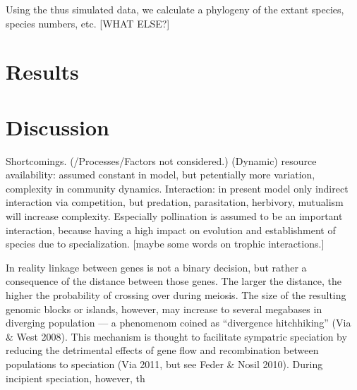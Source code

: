 \documentclass[a4paper]{scrartcl}
\begin{document}
Using the thus simulated data, we calculate a phylogeny of the extant species, species numbers, etc. [WHAT ELSE?]
\section{Results}

\section{Discussion}
Shortcomings. (/Processes/Factors not considered.)
(Dynamic) resource availability: assumed constant in model, but petentially more variation, complexity in community dynamics.
Interaction: in present model only indirect interaction via competition, but predation, parasitation, herbivory, mutualism will increase complexity.
Especially pollination is assumed to be an important interaction, because having a high impact on evolution and establishment of species due to specialization.
[maybe some words on trophic interactions.]

In reality linkage between genes is not a binary decision, but rather a consequence of the distance between those genes.
The larger the distance, the higher the probability of crossing over during meiosis.
The size of the resulting genomic blocks or islands, however, may increase to several megabases in diverging population ---
a phenomenom coined as ``divergence hitchhiking'' (Via \& West 2008). %
This mechanism is thought to facilitate sympatric speciation by reducing the detrimental effects of gene flow and
recombination between populations to speciation (Via 2011, but see Feder \& Nosil 2010).
During incipient speciation, however, th


\printbibliography
\end{document}
